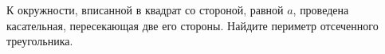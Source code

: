 \begin{ex}
	\begin{condition}
		К окружности, вписанной в квадрат со стороной, равной \( a \), проведена касательная, пересекающая две его стороны. Найдите периметр отсеченного треугольника.
	\end{condition}
\end{ex}